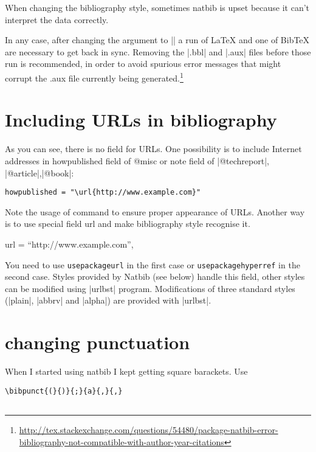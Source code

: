 \begin{refsection}
When changing the bibliography style, sometimes natbib is upset because it can't interpret the data correctly.

In any case, after changing the argument to || a run of LaTeX and one of BibTeX are necessary to get back in sync. Removing the |.bbl| and |.aux| files before those run is recommended, in order to avoid spurious error messages that might corrupt the .aux file currently being generated.\footnote{\url{http://tex.stackexchange.com/questions/54480/package-natbib-error-bibliography-not-compatible-with-author-year-citations}}

\section{Including URLs in bibliography}

As you can see, there is no field for URLs. One possibility is to include Internet addresses in howpublished field of @misc or note field of |@techreport|, |@article|,|@book|:

\begin{lstlisting}[language={[common]TeX},% 
                           alsolanguage={[LaTeX]TeX},% 
                           alsolanguage={[primitive]TeX},%
                           ]
howpublished = "\url{http://www.example.com}"
\end{lstlisting}

Note the usage of  command to ensure proper appearance of URLs.
Another way is to use special field url and make bibliography style recognise it.

\begin{commands}[]{}
url = \enquote{http://www.example.com},
\end{commands}

You need to use \texttt{usepackage{url}} in the first case or \texttt{usepackage{hyperref}} in the second case.
Styles provided by Natbib (see below) handle this field, other styles can be modified using |urlbst| program. Modifications of three standard styles (|plain|, |abbrv| and |alpha|) are provided with |urlbst|.


\section{changing punctuation}

When I started using natbib I kept getting square barackets. Use
\begin{lstlisting}[language={[common]TeX},% 
                           alsolanguage={[LaTeX]TeX},% 
                           alsolanguage={[primitive]TeX},%
                           ]
    \bibpunct{(}{)}{;}{a}{,}{,}
    
\end{lstlisting}


\end{refsection}
